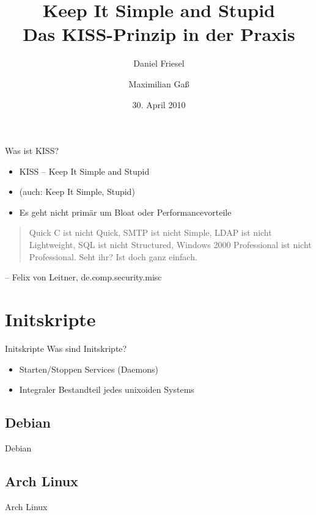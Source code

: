 \documentclass{beamer}
\title[Keep It Simple and Stupid]
	{Keep It Simple and Stupid\\Das KISS-Prinzip in der Praxis}
\author{Daniel Friesel \and Maximilian Gaß}
\institute{Chaosdorf}
\date{30. April 2010}
\begin{document}
\begin{frame}
	\titlepage
\end{frame}

\begin{frame}{Was ist KISS?}
	\begin{itemize}
		\item KISS -- Keep It Simple and Stupid
		\item (auch: Keep It Simple, Stupid)
		\pause \item Es geht nicht primär um Bloat oder Performancevorteile
	\end{itemize}
	\pause
	\begin{quote}
		Quick C ist nicht Quick, SMTP ist nicht Simple, LDAP ist nicht
		Lightweight, SQL ist nicht Structured, Windows 2000 Professional
		ist
		nicht Professional.  Seht ihr?  Ist doch ganz einfach.
	\end{quote}
	\begin{flushright}
		-- Felix von Leitner, de.comp.security.misc
	\end{flushright}
\end{frame}

\section{Initskripte}

\begin{frame}{Initskripte}
	Was sind Initskripte?\\

	\begin{itemize}
		\pause \item Starten/Stoppen Services (Daemons)
		\pause \item Integraler Bestandteil jedes unixoiden Systems
	\end{itemize}
\end{frame}

\subsection{Debian}
\begin{frame}{Debian}
	\lstset{basicstyle=\tiny}
	
\end{frame}

\subsection{Arch Linux}
\begin{frame}{Arch Linux}
	\lstset{basicstyle=\tiny}
	
\end{frame}
\end{document}
